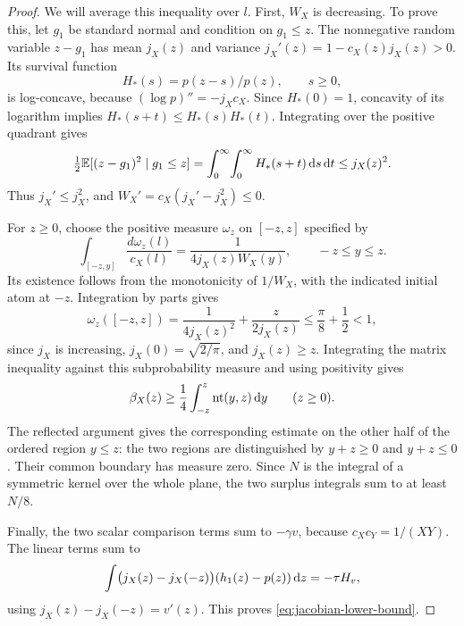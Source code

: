 \begin{proof}
We will average this inequality over $l$. First, $W_X$ is decreasing. To prove this, let $g_1$ be standard normal and condition on $g_1\le z$. The nonnegative random variable $z-g_1$ has mean $j_X(z)$ and variance $j_X'(z)=1-c_X(z)j_X(z)>0$. Its survival function
\[
H_*(s)=p(z-s)/p(z),\qquad s\ge0,
\]
is log-concave, because $(\log p)''=-j_Xc_X$. Since $H_*(0)=1$, concavity of its logarithm implies $H_*(s+t)\le H_*(s)H_*(t)$. Integrating over the positive quadrant gives
\[
\tfrac12\mathbb{E}[(z-g_1)^2\mid g_1\le z]
=\int_0^\infty\!\int_0^\infty H_*(s+t)\,\mathrm{d} s\,\mathrm{d} t
\le j_X(z)^2.
\]
Thus $j_X'\le j_X^2$, and $W_X'=c_X(j_X'-j_X^2)\le0$.

For $z\ge0$, choose the positive measure $\omega_z$ on $[-z,z]$ specified by
\[
\int_{[-z,y]}\frac{d\omega_z(l)}{c_X(l)}
=\frac1{4j_X(z)W_X(y)},\qquad -z\le y\le z.
\]
Its existence follows from the monotonicity of $1/W_X$, with the indicated initial atom at $-z$. Integration by parts gives
\[
\omega_z([-z,z])
=\frac1{4j_X(z)^2}+\frac{z}{2j_X(z)}
\le\frac\pi8+\frac12<1,
\]
since $j_X$ is increasing, $j_X(0)=\sqrt{2/\pi}$, and $j_X(z)\ge z$. Integrating the matrix inequality against this subprobability measure and using positivity gives
\[
\beta_X(z)\ge\frac14\int_{-z}^z\operatorname{nt}(y,z)\,\mathrm{d} y\qquad(z\ge0).
\]
The reflected argument gives the corresponding estimate on the other half of the ordered region $y\le z$: the two regions are distinguished by $y+z\ge0$ and $y+z\le0$. Their common boundary has measure zero. Since $N$ is the integral of a symmetric kernel over the whole plane, the two surplus integrals sum to at least $N/8$.

Finally, the two scalar comparison terms sum to $-\gamma v$, because $c_Xc_Y=1/(XY)$. The linear terms sum to
\[
\int\bigl(j_X(z)-j_X(-z)\bigr)(h_1(z)-p(z))\,\mathrm{d} z=-\tau H_v,
\]
using $j_X(z)-j_X(-z)=v'(z)$. This proves \eqref{eq:jacobian-lower-bound}.
\end{proof}

